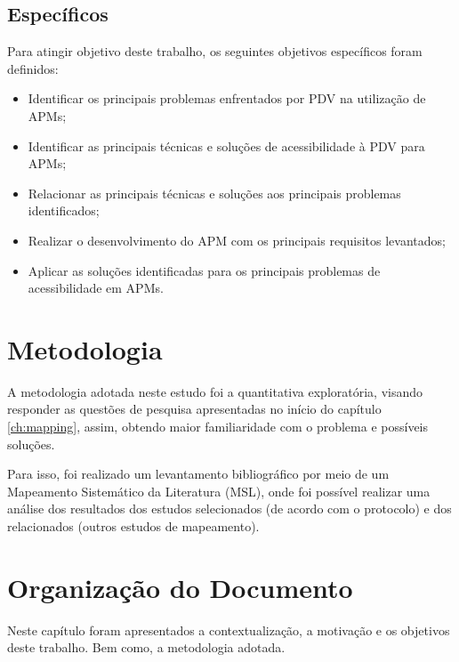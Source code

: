 \subsection{Específicos}

Para atingir objetivo deste trabalho, os seguintes objetivos específicos foram definidos:

\begin{itemize}
    \item Identificar os principais problemas enfrentados por PDV na utilização de APMs;
    \item Identificar as principais técnicas e soluções de acessibilidade à PDV para APMs;
    \item Relacionar as principais técnicas e soluções aos principais problemas identificados;
    \item Realizar o desenvolvimento do APM com os principais requisitos levantados;
    \item Aplicar as soluções identificadas para os principais problemas de acessibilidade em APMs\@.
\end{itemize}

\section{Metodologia}

A metodologia adotada neste estudo foi a quantitativa exploratória, visando responder as questões de pesquisa apresentadas
no início do capítulo \ref{ch:mapping}, assim, obtendo maior familiaridade com o problema e possíveis soluções.

Para isso, foi realizado um levantamento bibliográfico por meio de um Mapeamento Sistemático da Literatura (MSL), onde foi possível
realizar uma análise dos resultados dos estudos selecionados (de acordo com o protocolo) e dos relacionados (outros estudos de mapeamento).

\section{Organização do Documento}
Neste capítulo foram apresentados a contextualização, a motivação e os objetivos deste trabalho. Bem como, a metodologia adotada.

